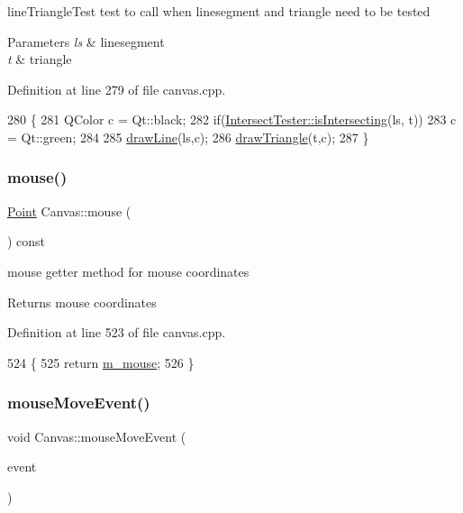 line\+Triangle\+Test test to call when linesegment and triangle need to be tested 


\begin{DoxyParams}{Parameters}
{\em ls} & linesegment \\
\hline
{\em t} & triangle \\
\hline
\end{DoxyParams}


Definition at line 279 of file canvas.\+cpp.


\begin{DoxyCode}
280 \{
281     QColor c = Qt::black;
282     \textcolor{keywordflow}{if}(\hyperlink{class_intersect_tester_a7710e17ff7d2e229059f23b9429213f5}{IntersectTester::isIntersecting}(ls, t))
283         c = Qt::green;
284 
285     \hyperlink{class_canvas_ae3ad5d92c9a2868b94a6570914b05366}{drawLine}(ls,c);
286     \hyperlink{class_canvas_a74dd9cf1e8f3b48e2df2b34886770ac6}{drawTriangle}(t,c);
287 \}
\end{DoxyCode}
\mbox{\label{class_canvas_a5c78c7a84c0f9d5540caeab66b677299}} 
\subsubsection{\texorpdfstring{mouse()}{mouse()}}
{\footnotesize\ttfamily \hyperlink{class_point}{Point} Canvas\+::mouse (\begin{DoxyParamCaption}{ }\end{DoxyParamCaption}) const}



mouse getter method for mouse coordinates 

\begin{DoxyReturn}{Returns}
mouse coordinates 
\end{DoxyReturn}


Definition at line 523 of file canvas.\+cpp.


\begin{DoxyCode}
524 \{
525     \textcolor{keywordflow}{return} \hyperlink{class_canvas_a37d2fd203dc21501aee37001e49789b1}{m\_mouse};
526 \}
\end{DoxyCode}
\mbox{\label{class_canvas_a9fb4b83a1067ddc2aa04676f51dc5a47}} 
\subsubsection{\texorpdfstring{mouse\+Move\+Event()}{mouseMoveEvent()}}
{\footnotesize\ttfamily void Canvas\+::mouse\+Move\+Event (\begin{DoxyParamCaption}\item[{Q\+Mouse\+Event $\ast$}]{event }\end{DoxyParamCaption})\hspace{0.3cm}{\ttfamily [private]}}



